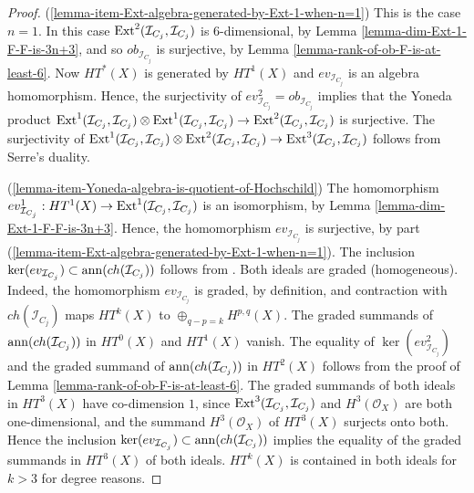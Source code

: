 \documentclass[12pt]{amsart}
\numberwithin{equation}{subsection}
\theoremstyle{plain}
\theoremstyle{definition}
\newcommand{\ann}{{\rm ann}}
\newcommand{\StructureSheaf}[1]{{\mathcal O}_{#1}}
\newcommand{\Ext}{{\rm Ext}}
\newcommand{\Ideal}[1]{{\mathcal I}_{#1}}
\begin{document}
\begin{proof}
(\ref{lemma-item-Ext-algebra-generated-by-Ext-1-when-n=1})
This is the case $n=1$. In this case $\Ext^2(\Ideal{C_j},\Ideal{C_j})$ is $6$-dimensional,
by Lemma \ref{lemma-dim-Ext-1-F-F-is-3n+3}, and so $ob_{\Ideal{C_j}}$ is surjective, 
by Lemma \ref{lemma-rank-of-ob-F-is-at-least-6}. Now $HT^*(X)$ is generated by $HT^1(X)$ and $ev_{\Ideal{C_j}}$
is an algebra homomorphism.  Hence, the surjectivity of $ev^2_{\Ideal{C_j}}=ob_{\Ideal{C_j}}$ implies that 
the Yoneda product $\Ext^1(\Ideal{C_j},\Ideal{C_j})\otimes \Ext^1(\Ideal{C_j},\Ideal{C_j})\rightarrow \Ext^2(\Ideal{C_j},\Ideal{C_j})$
is surjective. The surjectivity of $\Ext^1(\Ideal{C_j},\Ideal{C_j})\otimes \Ext^2(\Ideal{C_j},\Ideal{C_j})\rightarrow \Ext^3(\Ideal{C_j},\Ideal{C_j})$ follows from Serre's duality.

(\ref{lemma-item-Yoneda-algebra-is-quotient-of-Hochschild})
The homomorphism $ev_{\Ideal{C_j}}^1:HT^1(X)\rightarrow \Ext^1(\Ideal{C_j},\Ideal{C_j})$ is an isomorphism, by Lemma
 \ref{lemma-dim-Ext-1-F-F-is-3n+3}. Hence, the homomorphism $ev_{\Ideal{C_j}}$ is surjective, 
 by part (\ref{lemma-item-Ext-algebra-generated-by-Ext-1-when-n=1}). The inclusion 
 $\ker(ev_{\Ideal{C_j}})\subset \ann(ch(\Ideal{C_j}))$ 
 follows from \cite[Theorem B]{Huang}. Both ideals are graded (homogeneous). Indeed, the homomorphism $ev_{\Ideal{C_j}}$ is graded, by definition, and contraction with $ch(\Ideal{C_j})$ maps $HT^k(X)$ to $\oplus_{q-p=k}H^{p,q}(X)$.
 The graded summands of $\ann(ch(\Ideal{C_j}))$ in $HT^0(X)$ and $HT^1(X)$ vanish.
 The equality of $\ker(ev_{\Ideal{C_j}}^2)$ and the graded summand of $\ann(ch(\Ideal{C_j}))$ in $HT^2(X)$ follows from the proof of Lemma \ref{lemma-rank-of-ob-F-is-at-least-6}. The graded summands of both ideals in $HT^3(X)$ have co-dimension $1$, since $\Ext^3(\Ideal{C_j},\Ideal{C_j})$ and $H^3(\StructureSheaf{X})$ are both one-dimensional, and the summand $H^3(\StructureSheaf{X})$ of $HT^3(X)$ surjects onto both. 
 Hence the inclusion $\ker(ev_{\Ideal{C_j}})\subset \ann(ch(\Ideal{C_j}))$ 
implies the equality of the graded summands in $HT^3(X)$ of both ideals. $HT^k(X)$ is contained in both ideals for $k>3$ for degree reasons.


\end{proof}
\end{document}
